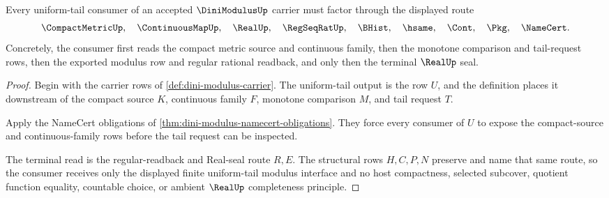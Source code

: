 \begin{theorem}
\label{thm:dini-modulus-uniform-tail-route}
Every uniform-tail consumer of an accepted $\DiniModulusUp$ carrier must factor through the displayed route
$$
\CompactMetricUp,\quad \ContinuousMapUp,\quad \RealUp,\quad
\RegSeqRatUp,\quad \BHist,\quad \hsame,\quad \Cont,\quad \Pkg,\quad \NameCert .
$$
Concretely, the consumer first reads the compact metric source and continuous family, then the monotone comparison and tail-request rows, then the exported modulus row and regular rational readback, and only then the terminal $\RealUp$ seal.
\end{theorem}
\begin{proof}
Begin with the carrier rows of \autoref{def:dini-modulus-carrier}. The uniform-tail output is the row $U$, and the definition places it downstream of the compact source $K$, continuous family $F$, monotone comparison $M$, and tail request $T$.

Apply the NameCert obligations of \autoref{thm:dini-modulus-namecert-obligations}. They force every consumer of $U$ to expose the compact-source and continuous-family rows before the tail request can be inspected.

The terminal read is the regular-readback and Real-seal route $R,E$. The structural rows $H,C,P,N$ preserve and name that same route, so the consumer receives only the displayed finite uniform-tail modulus interface and no host compactness, selected subcover, quotient function equality, countable choice, or ambient $\RealUp$ completeness principle.
\end{proof}




